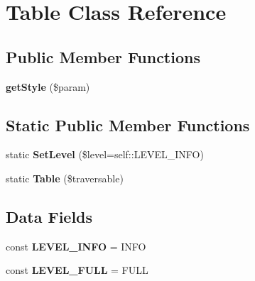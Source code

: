 \hypertarget{class_pes_1_1_debug_1_1_table}{}\section{Table Class Reference}
\label{class_pes_1_1_debug_1_1_table}
\subsection*{Public Member Functions}
\begin{DoxyCompactItemize}
\item 
\mbox{\label{class_pes_1_1_debug_1_1_table_a4ccfbc34578883f94ea24de490b1e151}} 
{\bfseries get\+Style} (\$param)
\end{DoxyCompactItemize}
\subsection*{Static Public Member Functions}
\begin{DoxyCompactItemize}
\item 
\mbox{\label{class_pes_1_1_debug_1_1_table_a1d475d85c17306dc9e71367f916133c3}} 
static {\bfseries Set\+Level} (\$level=self\+::\+L\+E\+V\+E\+L\+\_\+\+I\+N\+FO)
\item 
\mbox{\label{class_pes_1_1_debug_1_1_table_a395f376e767c10db9a331001a564840d}} 
static {\bfseries Table} (\$traversable)
\end{DoxyCompactItemize}
\subsection*{Data Fields}
\begin{DoxyCompactItemize}
\item 
\mbox{\label{class_pes_1_1_debug_1_1_table_a1ad83ec64fc8c921796619cb92259daa}} 
const {\bfseries L\+E\+V\+E\+L\+\_\+\+I\+N\+FO} = \textquotesingle{}I\+N\+FO\textquotesingle{}
\item 
\mbox{\label{class_pes_1_1_debug_1_1_table_a0434c495b9fcabe306889d98c33d1bf1}} 
const {\bfseries L\+E\+V\+E\+L\+\_\+\+F\+U\+LL} = \textquotesingle{}F\+U\+LL\textquotesingle{}
\end{DoxyCompactItemize}


